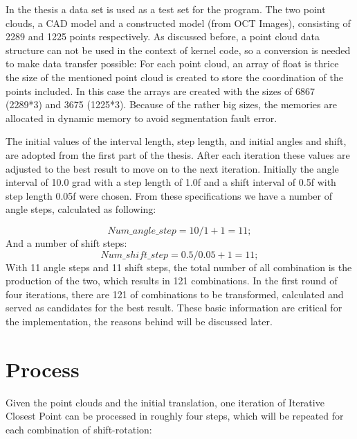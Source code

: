 In the thesis a data set is used as a test set for the program. The two point clouds, a CAD model and a constructed model (from OCT Images), consisting of 2289 and 1225 points respectively. As discussed before, a point cloud data structure can not be used in the context of kernel code, so a conversion is needed to make data transfer possible: For each point cloud, an array of float is thrice the size of the mentioned point cloud is created to store the coordination of the points included. In this case the arrays are created with the sizes of 6867 (2289*3) and 3675 (1225*3). Because of the rather big sizes, the memories are allocated in dynamic memory to avoid segmentation fault error.

The initial values of the interval length, step length, and initial angles and shift, are adopted from the first part of the thesis. After each iteration these values are adjusted to the best result to move on to the next iteration. Initially the angle interval of 10.0 grad with a step length of 1.0f and a shift interval of 0.5f with step length 0.05f were chosen. From these specifications we have a number of angle steps, calculated as following:

\begin{equation*}
Num\_angle\_step = 10/1 +1 = 11;
\end{equation*}
And a number of shift steps:
\begin{equation*}
Num\_shift\_step = 0.5/0.05 +1 = 11;
\end{equation*}
With 11 angle steps and 11 shift steps, the total number of all combination is the production of the two, which results in 121 combinations. In the first round of four iterations, there are 121 of combinations to be transformed, calculated and served as candidates for the best result. These basic information are critical for the implementation, the reasons behind will be discussed later.
\newpage
\section{Process}

Given the point clouds and the initial translation, one iteration of Iterative Closest Point can be processed in roughly four steps, which will be repeated for each combination of shift-rotation:

